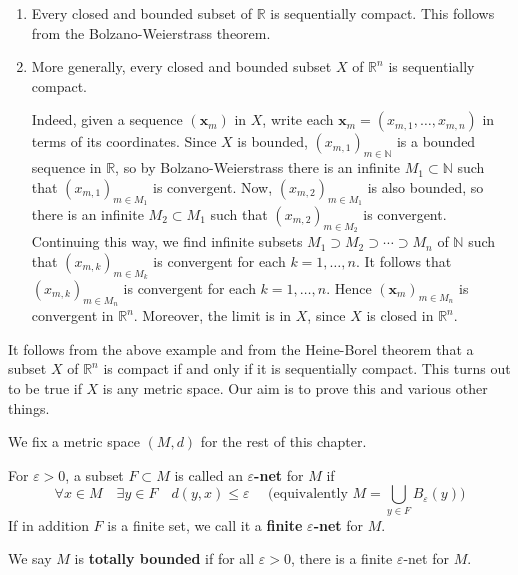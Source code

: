 \documentclass[a4paper]{article}
\begin{document}
\begin{example}
    \begin{enumerate}
        \item Every closed and bounded subset of $\mathbb{R}$ is sequentially compact. This follows from the Bolzano-Weierstrass theorem.
        \item More generally, every closed and bounded subset $X$ of $\mathbb{R}^{n}$ is sequentially compact. 
        
        Indeed, given a sequence $\left(\mathbf{x}_{m}\right)$ in $X$, write each $\mathbf{x}_{m}=\left(x_{m, 1}, \ldots, x_{m, n}\right)$ in terms of its coordinates. Since $X$ is bounded, $\left(x_{m, 1}\right)_{m \in \mathbb{N}}$ is a bounded sequence in $\mathbb{R}$, so by Bolzano-Weierstrass there is an infinite $M_{1} \subset \mathbb{N}$ such that $\left(x_{m, 1}\right)_{m \in M_{1}}$ is convergent. Now, $\left(x_{m, 2}\right)_{m \in M_{1}}$ is also bounded, so there is an infinite $M_{2} \subset M_{1}$ such that $\left(x_{m, 2}\right)_{m \in M_{2}}$ is convergent. Continuing this way, we find infinite subsets $M_{1} \supset M_{2} \supset \cdots \supset M_{n}$ of $\mathbb{N}$ such that $\left(x_{m, k}\right)_{m \in M_{k}}$ is convergent for each $k=1, \ldots, n$. It follows that $\left(x_{m, k}\right)_{m \in M_{n}}$ is convergent for each $k=1, \ldots, n$. Hence $\left(\mathbf{x}_{m}\right)_{m \in M_{n}}$ is convergent in $\mathbb{R}^{n}$. Moreover, the limit is in $X$, since $X$ is closed in $\mathbb{R}^{n}$.
      \end{enumerate}      
\end{example}
\begin{remark}
    It follows from the above example and from the Heine-Borel theorem that a subset $X$ of $\mathbb{R}^{n}$ is compact if and only if it is sequentially compact. This turns out to be true if $X$ is any metric space. Our aim is to prove this and various other things.
\end{remark}

\begin{definition}
    We fix a metric space $(M, d)$ for the rest of this chapter.

For $\varepsilon>0$, a subset $F \subset M$ is called an $\varepsilon$\textbf{-net} for $M$ if
$$
\forall x \in M \quad \exists y \in F \quad d(y, x) \leqslant \varepsilon \quad \text { (equivalently } M=\bigcup_{y \in F} B_{\varepsilon}(y))
$$
If in addition $F$ is a finite set, we call it a \textbf{finite} $\varepsilon$\textbf{-net} for $M$.

We say $M$ is \textbf{totally bounded} if for all $\varepsilon>0$, there is a finite $\varepsilon$-net for $M$.
\end{definition}
\end{document}
